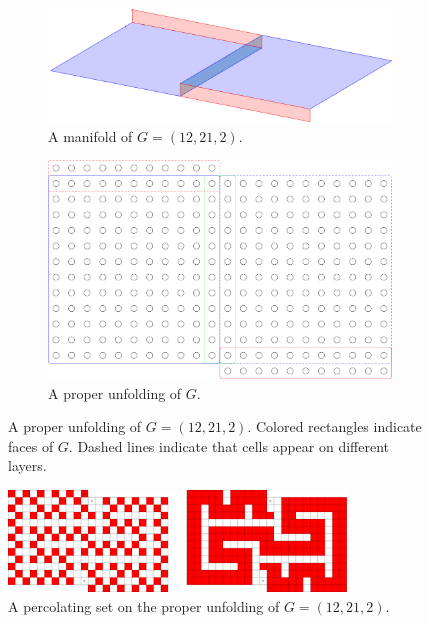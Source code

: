 \begin{figure}[H]
\centering
\begin{subfigure}{0.45\textwidth}
	\includegraphics[width=\textwidth]{figures/7/12x21x2_manifold_3d.pdf}
	\caption{A manifold of $G= (12,21,2)$.}
	\label{}
\end{subfigure} \hfill%
\begin{subfigure}{0.45\textwidth}
	\includegraphics[width=\textwidth]{figures/7/12x21x2_unfolded.pdf}
	\caption{A proper unfolding of $G$.}
	\label{}
\end{subfigure}
\caption{A proper unfolding of $G= (12,21,2)$. Colored rectangles indicate faces of $G$. Dashed lines indicate that cells appear on different layers. }
\label{fig:12x21x2_unfolded}
\end{figure} 

\begin{figure}[H]
\centering
\includegraphics[width=0.8\textwidth]{figures/7/12x21x2_unfolded_lethal.pdf}
\caption{A percolating set on the proper unfolding of $G= (12,21,2)$.}
\label{fig:12x21x2_unfolded_lethal}
\end{figure} 

